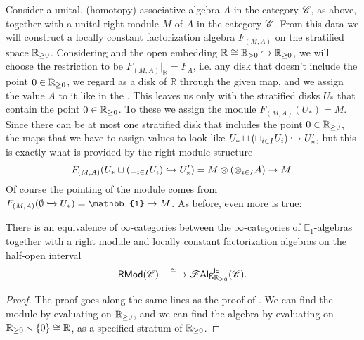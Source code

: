 \documentclass[../text]{subfiles}
\begin{document}
\begin{construction}\label{con:lcfas_on_hoint}
    Consider a unital, (homotopy) associative algebra $A$ in the category $\mathscr{C}$, as above, together with a unital right module $M$ of $A$ in the category $\mathscr{C}$. From this data we will construct a locally constant factorization algebra $F_{(M, A)}$ on the stratified space $\mathbb{R}_{\geq 0}$. Considering  and the open embedding $\mathbb{R} \cong \mathbb{R}_{>0} \xhookrightarrow{} \mathbb{R}_{\geq 0}$, we will choose the restriction to be $F_{(M,A)}|_{\mathbb{R}} = F_A$, i.e. any disk that doesn't include the point $0 \in \mathbb{R}_{\geq 0}$, we regard as a disk of $\mathbb{R}$ through the given map, and we assign the value $A$ to it like in the . This leaves us only with the stratified disks $U_*$ that contain the point $0 \in \mathbb{R}_{\geq 0}$. To these we assign the module $F_{(M,A)}(U_*) = M$. Since there can be at most one stratified disk that includes the point $0 \in \mathbb{R}_{\geq 0}$, the maps that we have to assign values to look like $U_* \sqcup (\sqcup_{i \in I} U_i) \xhookrightarrow{} U'_*$, but this is exactly what is provided by the right module structure
    \begin{equation}
        F_{(M,A)} (U_* \sqcup (\sqcup_{i \in I} U_i) \xhookrightarrow{} U'_*) = M \otimes (\otimes_{i \in I} A) \rightarrow M.
    \end{equation}
    Of course the pointing of the module comes from $F_{(M,A)}(\emptyset \xhookrightarrow{} U_*) = \mathbb{1} \rightarrow M$. As before, even more is true:
\end{construction}

\begin{proposition}\label{prop:hoint_gives_modules}
    There is an equivalence of $\infty$-categories between the $\infty$-categories of $\mathbb{E}_1$-algebras together with a right module and locally constant factorization algebras on the half-open interval
    \begin{equation}
        \mathsf{RMod}(\catC) \xrightarrow{\ \ \simeq \ \ } \lcfa_{\hoint} (\catC).
    \end{equation}
\end{proposition}

\begin{proof}
    The proof goes along the same lines as the proof of . We can find the module by evaluating on $\mathbb{R}_{\geq 0}$, and we can find the algebra by evaluating on $\mathbb{R}_{\geq 0} \smallsetminus \{ 0 \} \cong \mathbb{R}$, as a specified stratum of $\mathbb{R}_{\geq 0}$.
\end{proof}
\end{document}
